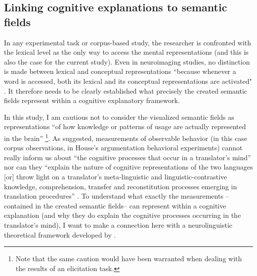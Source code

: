 \subsection{Linking cognitive explanations to semantic fields}
\label{sec:5.1.2}  
In any experimental task or corpus-based study, the researcher is confronted with the lexical level as the only way to access the mental representations (and this is also the case for the current study). Even in neuroimaging studies, no distinction is made between lexical and conceptual representations “because whenever a word is accessed, both its lexical and its conceptual representations are activated" \citep[200-201]{paradis_neurolinguistic_2004}. It therefore needs to be clearly established what precisely the created semantic fields represent within a cognitive explanatory framework.

In this study, I am cautious not to consider the visualized semantic fields as representations “of how knowledge or patterns of usage are actually represented in the brain” \citep[146]{divjak_structuring_2010}\footnote{Note that the same caution would have been warranted when dealing with the results of an elicitation task.}. As \citet[51]{house_towards_2013} suggested, measurements of observable behavior (in this case corpus observations, in House’s argumentation behavioral experiments) cannot really inform us about “the cognitive processes that occur in a translator’s mind” nor can they “explain the nature of cognitive representations of the two languages [or] throw light on a translator’s meta-linguistic and linguistic-contrastive knowledge, comprehension, transfer and reconstitution processes emerging in translation procedures” \citep[50-51]{house_towards_2013}. To understand what exactly the measurements – contained in the created semantic fields– can represent within a cognitive explanation (and why they do explain the cognitive processes occurring in the translator’s mind), I want to make a connection here with a neurolinguistic theoretical framework developed by \citet{paradis_neurolinguistic_2004, kecskes_neurofunctional_2007}. 

